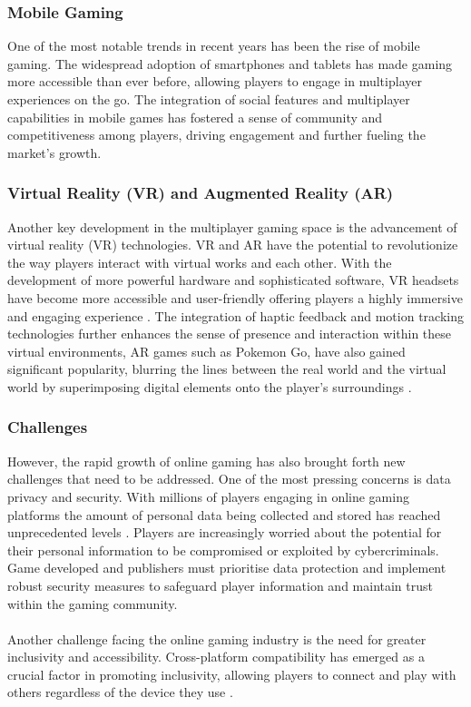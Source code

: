 \subsubsection{Mobile Gaming}
One of the most notable trends in recent years has been the rise of mobile gaming. The widespread adoption of smartphones and tablets has made gaming more accessible than ever before, allowing players to engage in multiplayer experiences on the go. The integration of social features and multiplayer capabilities in mobile games has fostered a sense of community and competitiveness among players, driving engagement and further fueling the market's growth.
\subsubsection{Virtual Reality (VR) and Augmented Reality (AR)}
Another key development in the multiplayer gaming space is the advancement of virtual reality (VR) technologies. VR and AR have the potential to revolutionize the way players interact with virtual works and each other. With the development of more powerful hardware and sophisticated software, VR headsets have become more accessible and user-friendly offering players a highly immersive and engaging experience \cite{advancement-onlinegaming}. The integration of haptic feedback and motion tracking technologies further enhances the sense of presence and interaction within these virtual environments, AR games such as Pokemon Go, have also gained significant popularity, blurring the lines between the real world and the virtual world by superimposing digital elements onto the player's surroundings \cite{advancement-onlinegaming}.

\subsubsection{Challenges}
However, the rapid growth of online gaming has also brought forth new challenges that need to be addressed. One of the most pressing concerns is data privacy and security. With millions of players engaging in online gaming platforms the amount of personal data being collected and stored has reached unprecedented levels \cite{future-onlinegaming}. Players are increasingly worried about the potential for their personal information to be compromised or exploited by cybercriminals. Game developed and publishers must prioritise data protection and implement robust security measures to safeguard player information and maintain trust within the gaming community.
\\
\noindent
\\
Another challenge facing the online gaming industry is the need for greater inclusivity and accessibility. Cross-platform compatibility has emerged as a crucial factor in promoting inclusivity, allowing players to connect and play with others regardless of the device they use \cite{future-onlinegaming}.

